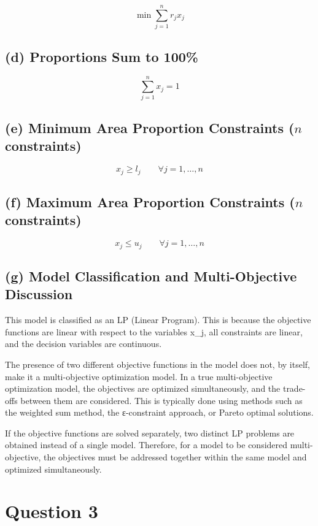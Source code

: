 \documentclass[12pt,a4paper]{article}
\begin{document}
\[
\min \sum_{j=1}^{n} r_j x_j
\]

\subsection*{(d) Proportions Sum to 100\%}

\[
\sum_{j=1}^{n} x_j = 1
\]

\subsection*{(e) Minimum Area Proportion Constraints ($n$ constraints)}

\[
x_j \geq l_j \qquad \forall j = 1, \ldots, n
\]

\subsection*{(f) Maximum Area Proportion Constraints ($n$ constraints)}

\[
x_j \leq u_j \qquad \forall j = 1, \ldots, n
\]

\subsection*{(g) Model Classification and Multi-Objective Discussion}

This model is classified as an LP (Linear Program). This is because the objective functions are linear with respect to the variables x_j, all constraints are linear, and the decision variables are continuous.

The presence of two different objective functions in the model does not, by itself, make it a multi-objective optimization model. In a true multi-objective optimization model, the objectives are optimized simultaneously, and the trade-offs between them are considered. This is typically done using methods such as the weighted sum method, the ε-constraint approach, or Pareto optimal solutions.

If the objective functions are solved separately, two distinct LP problems are obtained instead of a single model. Therefore, for a model to be considered multi-objective, the objectives must be addressed together within the same model and optimized simultaneously.


\section*{Question 3}
\end{document}
